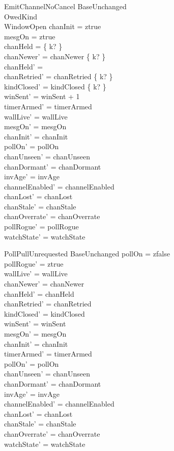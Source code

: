 \documentclass[a4paper,10pt,fleqn]{article}
\begin{document}
\begin{schema}{EmitChannelNoCancel}
  BaseUnchanged \\
  OwedKind \\
  WindowOpen
  \where
  chanInit = ztrue \\
  mesgOn = ztrue \\
  chanHeld = \{ k? \} \\
  chanNewer' = chanNewer \setminus \{ k? \} \\
  chanHeld' = \emptyset \\
  chanRetried' = chanRetried \setminus \{ k? \} \\
  kindClosed' = kindClosed \cup \{ k? \} \\
  winSent' = winSent + 1 \\
  timerArmed' = timerArmed \\
  wallLive' = wallLive \\
  mesgOn' = mesgOn \\
  chanInit' = chanInit \\
  pollOn' = pollOn \\
  chanUnseen' = chanUnseen \\
  chanDormant' = chanDormant \\
  invAge' = invAge \\
  channelEnabled' = channelEnabled \\
  chanLost' = chanLost \\
  chanStale' = chanStale \\
  chanOverrate' = chanOverrate \\
  pollRogue' = pollRogue \\
  watchState' = watchState
\end{schema}

\begin{schema}{PollPullUnrequested}
  BaseUnchanged
  \where
  pollOn = zfalse \\
  pollRogue' = ztrue \\
  wallLive' = wallLive \\
  chanNewer' = chanNewer \\
  chanHeld' = chanHeld \\
  chanRetried' = chanRetried \\
  kindClosed' = kindClosed \\
  winSent' = winSent \\
  mesgOn' = mesgOn \\
  chanInit' = chanInit \\
  timerArmed' = timerArmed \\
  pollOn' = pollOn \\
  chanUnseen' = chanUnseen \\
  chanDormant' = chanDormant \\
  invAge' = invAge \\
  channelEnabled' = channelEnabled \\
  chanLost' = chanLost \\
  chanStale' = chanStale \\
  chanOverrate' = chanOverrate \\
  watchState' = watchState
\end{schema}
\end{document}
